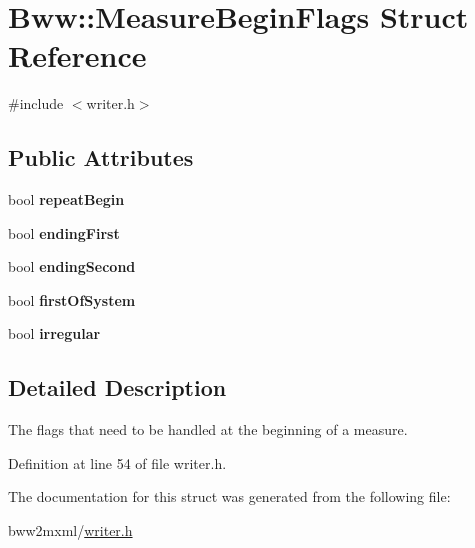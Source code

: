 \hypertarget{struct_bww_1_1_measure_begin_flags}{}\section{Bww\+:\+:Measure\+Begin\+Flags Struct Reference}
\label{struct_bww_1_1_measure_begin_flags}


{\ttfamily \#include $<$writer.\+h$>$}

\subsection*{Public Attributes}
\begin{DoxyCompactItemize}
\item 
\mbox{\label{struct_bww_1_1_measure_begin_flags_aa2f3abc547464ea164c84ce73a34a8a6}} 
bool {\bfseries repeat\+Begin}
\item 
\mbox{\label{struct_bww_1_1_measure_begin_flags_a2dd3cec954797b3b5f3283fa392c1828}} 
bool {\bfseries ending\+First}
\item 
\mbox{\label{struct_bww_1_1_measure_begin_flags_a5571c91d302064b7c31a68277f90cdc5}} 
bool {\bfseries ending\+Second}
\item 
\mbox{\label{struct_bww_1_1_measure_begin_flags_a6fd66636508590b2940ce41b4e70ace3}} 
bool {\bfseries first\+Of\+System}
\item 
\mbox{\label{struct_bww_1_1_measure_begin_flags_affb5fe2c249e4d26e7df0b30116c0be5}} 
bool {\bfseries irregular}
\end{DoxyCompactItemize}


\subsection{Detailed Description}
The flags that need to be handled at the beginning of a measure. 

Definition at line 54 of file writer.\+h.



The documentation for this struct was generated from the following file\+:\begin{DoxyCompactItemize}
\item 
bww2mxml/\hyperlink{writer_8h}{writer.\+h}\end{DoxyCompactItemize}
